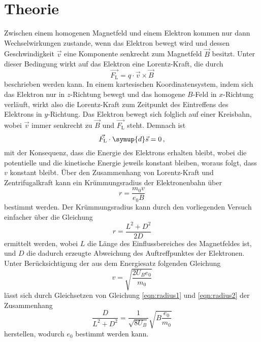 \section{Theorie}
\label{sec:Theorie}

Zwischen einem homogenen Magnetfeld und einem Elektron kommen nur dann Wechselwirkungen zustande, wenn das Elektron bewegt wird
und dessen Geschwindigkeit $\vec{v}$ eine Komponente senkrecht zum Magnetfeld $\vec{B}$ besitzt. Unter dieser Bedingung wirkt 
auf das Elektron eine Lorentz-Kraft, die durch 
\begin{equation}
    \vec{F_\text{L}} = q\cdot \vec{v} \times \vec{B}
    \label{eqn:lorentz}
\end{equation}
beschrieben werden kann. In einem kartesischen Koordinatensystem, indem sich das Elektron nur in $z$-Richtung bewegt und das
homogene $B$-Feld in $x$-Richtung verläuft, wirkt also die Lorentz-Kraft zum Zeitpunkt des Eintreffens des Elektrons in 
$y$-Richtung. Das Elektron bewegt sich folglich auf einer Kreisbahn, wobei $\vec{v} $ immer 
senkrecht zu $\vec{B} $ und $\vec{F_\text{L}}$ steht. Demnach ist
\begin{equation}
    \vec{F_\text{L}} \cdot \symup{d}\vec{s} = 0\,,
\end{equation}
mit der Konsequenz, dass die Energie des Elektrons erhalten bleibt, wobei die potentielle und die kinetische Energie jeweils 
konstant bleiben, woraus folgt, dass $v$ konstant bleibt. Über den Zusammenhang von Lorentz-Kraft und Zentrifugalkraft kann ein 
Krümmungsradius der Elektronenbahn über 
\begin{equation}
    r = \frac{m_0 v}{e_0 B}
    \label{eqn:radius1}
\end{equation}
bestimmt werden.  
Der Krümmungsradius kann durch den vorliegenden Versuch einfacher über die Gleichung 
\begin{equation}
    r = \frac{L^2 + D^2}{2D}
    \label{eqn:radius2}
\end{equation}
ermittelt werden, wobei $L$ die Länge des Einflussbereiches des Magnetfeldes ist, und $D$ die dadurch erzeugte Abweichung des 
Auftreffpunktes der Elektronen. Unter Berücksichtigung der aus dem Energiesatz folgenden Gleichung 
\begin{equation}
    v = \sqrt{\frac{2 U_B e_0}{m_0}}
\end{equation} 
lässt sich durch Gleichsetzen von Gleichung \ref{eqn:radius1} und \ref{eqn:radius2} der Zusammenhang 
\begin{equation}
    \frac{D}{L^2 + D^2} = \frac{1}{\sqrt{8U_B}} \sqrt{B \frac{e_0}{m_0}}
\end{equation}
herstellen, wodurch $e_0$ bestimmt werden kann. 